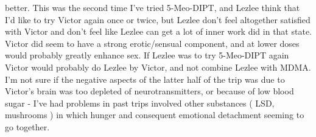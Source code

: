 \documentclass[12pt]{book}
\begin{document}
better. This was the second time I've tried 5-Meo-DIPT, and Lezlee think that I'd like to try Victor again once or twice, but Lezlee don't feel altogether satisfied with Victor and don't feel like Lezlee can get a lot of inner work did in that state. Victor did seem to have a strong erotic/sensual component, and at lower doses would probably greatly enhance sex. If Lezlee was to try 5-Meo-DIPT again Victor would probably do Lezlee by Victor, and not combine Lezlee with MDMA. I'm not sure if the negative aspects of the latter half of the trip was due to Victor's brain was too depleted of neurotransmitters, or because of low blood sugar - I've had problems in past trips involved other substances ( LSD, mushrooms ) in which hunger and consequent emotional detachment seeming to go together.
\end{document}
